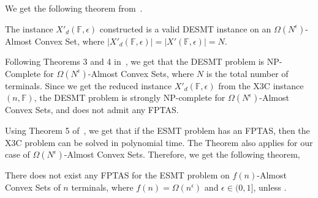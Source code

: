 We get the following theorem from~.

\begin{theorem}\label{thm:desmt_redn}
    The instance $X'_{d}(\mathbb{F},\epsilon)$ constructed is a valid DESMT instance on an $\Omega(N^\epsilon)$-Almost Convex Set, where  $|X'_{d}(\mathbb{F},\epsilon)| = |X'(\mathbb{F},\epsilon)| = N$.
\end{theorem}

Following Theorems 3 and 4 in~\cite{garey1977complexity}, we get that the DESMT problem is NP-Complete for $\Omega(N^\epsilon)$-Almost Convex Sets, where $N$ is the total number of terminals. Since we get the reduced instance $X'_{d}(\mathbb{F},\epsilon)$ from the X3C instance $(n,\mathbb{F})$, the DESMT problem is strongly NP-complete for $\Omega(N^\epsilon)$-Almost Convex Sets, and does not admit any FPTAS.

Using Theorem 5 of~\cite{garey1977complexity}, we get that if the ESMT problem has an FPTAS, then the X3C problem can be solved in polynomial time. The Theorem also applies for our case of $\Omega(N^\epsilon)$-Almost Convex Sets. Therefore, we get the following theorem,

\begin{theorem}\label{thm:no_fptas}
    There does not exist any FPTAS for the ESMT problem on $f(n)$-Almost Convex Sets of $n$ terminals, where $f(n) = \Omega(n^\epsilon)$ and $\epsilon \in (0,1]$, unless \pnp.
\end{theorem}
